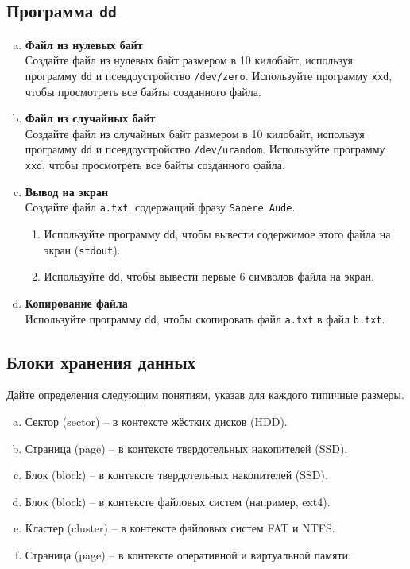 \documentclass{article}
\begin{document}
\subsection{Программа \texttt{dd}}

\begin{enumerate}[a.]
\item \textbf{Файл из нулевых байт}\\
Создайте файл из нулевых байт размером в 10 килобайт, используя программу \texttt{dd} и псевдоустройство \texttt{/dev/zero}. Используйте программу \texttt{xxd}, чтобы просмотреть все байты созданного файла.

\item \textbf{Файл из случайных байт}\\
Создайте файл из случайных байт размером в 10 килобайт, используя программу \texttt{dd} и псевдоустройство \texttt{/dev/urandom}. Используйте программу \texttt{xxd}, чтобы просмотреть все байты созданного файла.

\item \textbf{Вывод на экран}\\
Создайте файл \texttt{a.txt}, содержащий фразу \texttt{Sapere Aude}.
\begin{enumerate}
\item Используйте программу \texttt{dd}, чтобы вывести содержимое этого файла на экран (\texttt{stdout}).
\item Используйте \texttt{dd}, чтобы вывести первые 6 символов файла на экран.
\end{enumerate}

\item \textbf{Копирование файла}\\
Используйте программу \texttt{dd}, чтобы скопировать файл \texttt{a.txt} в файл \texttt{b.txt}.
\end{enumerate}

\subsection{Блоки хранения данных}
Дайте определения следующим понятиям, указав для каждого типичные размеры.
\begin{enumerate}[(a)]
\item Сектор (sector) -- в контексте жёстких дисков (HDD).
\item Страница (page) -- в контексте твердотельных накопителей (SSD).
\item Блок (block) -- в контексте твердотельных накопителей (SSD).
\item Блок (block) -- в контексте файловых систем (например, ext4).
\item Кластер (cluster) -- в контексте файловых систем FAT и NTFS.
\item Страница (page) -- в контексте оперативной и виртуальной памяти.
\end{enumerate}
\end{document}
